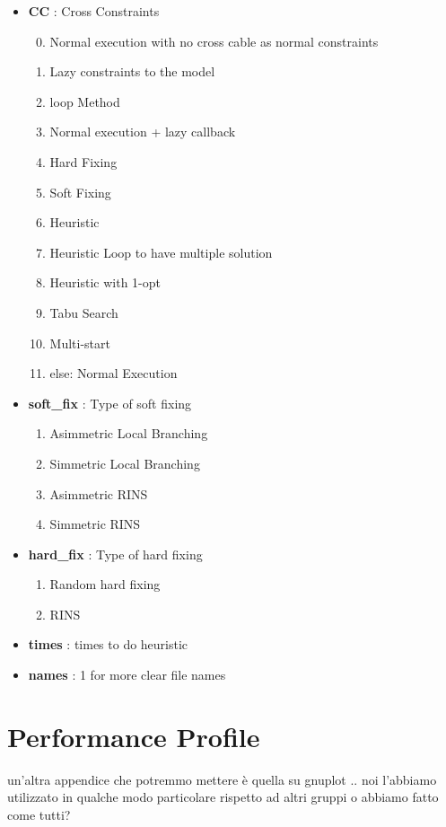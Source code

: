 \begin{appendices}
\begin{itemize}
\item \textbf{CC} : Cross Constraints
\begin{enumerate}\setcounter{enumi}{-1}
\setlength{\parskip}{0pt}
\setlength{\itemsep}{0pt plus 1pt}
	\item Normal execution with no cross cable as normal constraints
	\item Lazy constraints to the model
	\item loop Method
	\item Normal execution + lazy callback
	\item Hard Fixing
	\item Soft Fixing
	\item Heuristic
	\item Heuristic Loop to have multiple solution
	\item Heuristic with 1-opt
	\item Tabu Search
	\item Multi-start
	\item[] else: Normal Execution
\end{enumerate}
\item \textbf{soft\_fix} : Type of soft fixing
\begin{enumerate}\setcounter{enumi}{0}
\setlength{\parskip}{0pt}
\setlength{\itemsep}{0pt plus 1pt}
	\item Asimmetric Local Branching
	\item Simmetric Local Branching
	\item Asimmetric RINS
	\item Simmetric RINS
\end{enumerate}
\item \textbf{hard\_fix} : Type of hard fixing
\begin{enumerate}\setcounter{enumi}{0}
\setlength{\parskip}{0pt}
\setlength{\itemsep}{0pt plus 1pt}
	\item Random hard fixing
	\item RINS
\end{enumerate}
\item \textbf{times} : times to do heuristic
\item \textbf{names} : 1 for more clear file names
\end{itemize}

\chapter{Performance Profile}
un'altra appendice che potremmo mettere è quella su gnuplot .. noi l'abbiamo utilizzato in qualche modo particolare rispetto ad altri gruppi o abbiamo fatto come tutti? 


\end{appendices}
